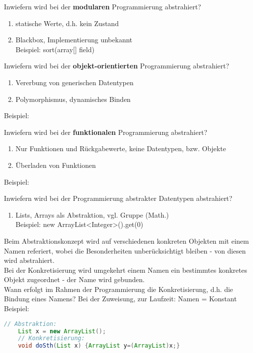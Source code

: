 \begin{card}
	Inwiefern wird bei der \textbf{modularen} Programmierung abstrahiert?
	\hr
	\begin{enumerate}
	\item statische Werte, d.h. kein Zustand
	\item Blackbox, Implementierung unbekannt\\
		Beispiel: sort(array[] field)
	\end{enumerate}

\end{card}

\begin{card}
	Inwiefern wird bei der \textbf{objekt-orientierten} Programmierung abstrahiert?
	\hr
	\begin{enumerate}
	\item Vererbung von generischen Datentypen
	\item Polymorphismus, dynamisches Binden
	\end{enumerate}
	Beispiel:
\end{card}

\begin{card}
	Inwiefern wird bei der \textbf{funktionalen} Programmierung abstrahiert?
	\hr
	\begin{enumerate}
	\item Nur Funktionen und Rückgabewerte, keine Datentypen, bzw. Objekte
	\item Überladen von Funktionen
	\end{enumerate}
	Beispiel:
\end{card}

\begin{card}
	Inwiefern wird bei der Programmierung abstrakter Datentypen abstrahiert?
	\hr
	\begin{enumerate}
	\item Lists, Arrays als Abstraktion, vgl. Gruppe (Math.)\\
		Beispiel: new ArrayList<Integer>().get(0)
	\end{enumerate}
\end{card}

\begin{card}
	Beim Abstraktionskonzept wird auf verschiedenen konkreten Objekten mit einem Namen referiert, wobei die Besonderheiten unberücksichtigt bleiben - von diesen wird abstrahiert.\\
	Bei der Konkretisierung wird umgekehrt einem Namen ein bestimmtes konkretes Objekt zugeordnet - der Name wird gebunden.\\
	Wann erfolgt im Rahmen der Programmierung die Konkretisierung, d.h. die Bindung	eines Namens?
	\hr
	Bei der Zuweisung, zur Laufzeit: Namen = Konstant\\
	Beispiel:
	\begin{lstlisting}[language=Java]
	// Abstraktion:
	List x = new ArrayList();
	// Konkretisierung:
	void doSth(List x) {ArrayList y=(ArrayList)x;}
	\end{lstlisting}
\end{card}


